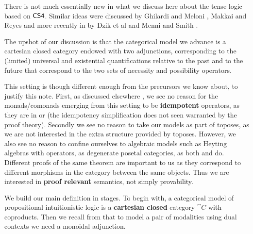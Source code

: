 There is not much essentially new in what we discuss here about the
tense logic based on $\sf{CS4}$. Similar ideas were discussed by
Ghilardi and Meloni \cite{ghilardi1988}, Makkai and Reyes
\cite{makkai1995} and more recently in by Dzik et al
\cite{dziketal2012,dziketal2014} and Menni and Smith
\cite{Menni:2014}.

The upshot of our discussion is that the categorical model we advance
is a cartesian closed category endowed with two adjunctions,
corresponding to the (limited) universal and existential
quantifications relative to the past and to the future that correspond
to the two sets of necessity and possibility operators.

This setting is though different enough from the precursors we know
about, to justify this note. First, as discussed elsewhere
\cite{bierman2000}, we see no reason for the monads/comonads emerging
from this setting to be \textbf{idempotent} operators, as they are in
\cite{ghilardi1988} or \cite{makkai1995} (the idempotency
simplification does not seen warranted by the proof theory). Secondly
we see no reason to take our models as part of toposes, as we are not
interested in the extra structure provided by toposes.  However, we
also see no reason to confine ourselves to algebraic models such as
Heyting algebras with operators, as degenerate posetal categories, as
both \cite{dziketal2012} and \cite{Menni:2014} do. Different proofs of
the same theorem are important to us as they correspond to different
morphisms in the category between the same objects. Thus we are
interested in \textbf{proof relevant} semantics, not simply
provability.

We build our main definition in stages. To begin with, a categorical
model of propositional intuitionistic logic is a \textbf{cartesian
  closed} category $\cat{C}$ with coproducts.
Then we recall from \cite{bierman2000} that to model a pair of
modalities using dual contexts we need a monoidal adjunction.

